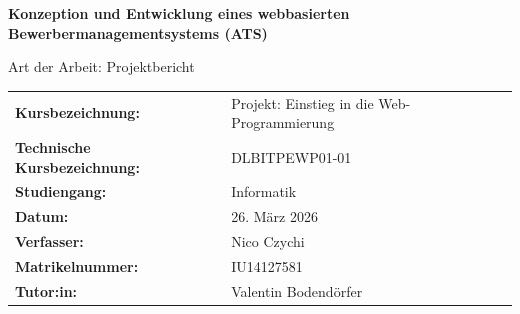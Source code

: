 \begin{titlepage}
    \centering

    \vspace*{2cm}

    {\fontsize{16pt}{20pt}\bfseries
        Konzeption und Entwicklung eines webbasierten\\
        Bewerbermanagementsystems (ATS)
    \par}

    \vspace{1.5cm}

    {\fontsize{13pt}{16pt}
        Art der Arbeit: Projektbericht
    \par}

    \vspace{3cm}

    \begin{tabular}{ll}
        \textbf{Kursbezeichnung:}  & Projekt: Einstieg in die Web-Programmierung              \\[0.5em]
        \textbf{Technische Kursbezeichnung:}  & DLBITPEWP01-01    \\[0.5em]
        \textbf{Studiengang:}      & Informatik                  \\[0.5em]
        \textbf{Datum:}            & 26. März 2026               \\[0.5em]
        \textbf{Verfasser:}     & Nico Czychi                 \\[0.5em]
        \textbf{Matrikelnummer:}   & IU14127581                  \\[0.5em]
        \textbf{Tutor:in:}         & Valentin Bodendörfer  \\[0.5em]
    \end{tabular}

    \vfill

\end{titlepage}
